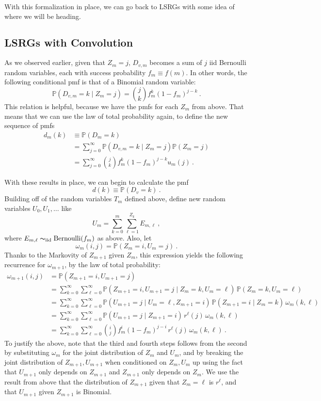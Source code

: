 \documentclass[12pt]{article}
\newcommand{\iid}{\mathrm{iid}}
\renewcommand{\P}{\mathbb{P}}
\begin{document}
With this formalization in place, we can go back to LSRGs with some idea
of where we will be heading.

\subsection{\textbf{\textsf{LSRGs with Convolution}}}

As we observed earlier, given that $Z_m=j$, $D_{v, m}$ becomes a sum of
$j$ iid Bernoulli random variables, each with success probability $f_m\equiv f(m)$.
In other words, the following conditional pmf is that of a Binomial random
variable: \[ \P(D_{v,m} = k \mid Z_m = j) = {j \choose k} f_m^k(1-f_m)^{j-k}\ .\]
This relation is helpful, because we have the pmfs for each $Z_m$ from above.
That means that we can use the law of total probability again, to define the
new sequence of pmfs
\begin{align*}
d_m(k) &\equiv \P(D_m=k) \\
       &= \sum_{j=0}^\infty \P(D_{v,m}=k \mid Z_m = j)\P(Z_m=j)\\
       &= \sum_{j=0}^\infty {j \choose k} f_m^k(1-f_m)^{j-k} u_m(j)\ .
\end{align*}\par
With these results in place, we can begin to calculate the pmf\[d(k)\equiv \P(D_v = k)\ .\]
Building off of the random variables $T_m$ defined above, define new random
variables $U_0,U_1,\dotsc$ like \[U_m = \sum_{k=0}^m \sum_{\ell=1}^{Z_k} E_{m,\ell}\ ,\]
where $E_{m,\ell}\thicksim_\iid \text{Bernoulli}(f_m)$ as above. Also, let
\[ \omega_m(i, j)=\P(Z_m=i, U_m=j)\ .\] Thanks to the Markovity of $Z_{m+1}$ given
$Z_m$, this expression yields the following recurrence for $\omega_{m+1}$, 
by the law of total probability:
\begin{align*}
\omega_{m+1}(i,j)&=\P(Z_{m+1}=i, U_{m+1}=j)\\
&= \sum_{k=0}^\infty \sum_{\ell=0}^\infty \P(Z_{m+1}=i,U_{m+1}=j\mid Z_m=k, U_m=\ell)\,\P(Z_m=k,U_m=\ell)\\
&= \sum_{k=0}^\infty\sum_{\ell=0}^\infty \P(U_{m+1}=j\mid U_m=\ell,Z_{m+1}=i)\,\P(Z_{m+1}=i\mid Z_m=k)\,\omega_m(k,\ell) \\
&= \sum_{k=0}^\infty\sum_{\ell=0}^\infty \P(U_{m+1}=j\mid Z_{m+1}=i)\,r^\ell(j)\,\omega_m(k,\ell) \\
&= \sum_{k=0}^\infty\sum_{\ell=0}^\infty \binom{i}{j} f_m^i (1 - f_m)^{j-i}\,r^\ell(j)\,\omega_m(k,\ell) \ .
\end{align*}
To justify the above, note that the third and fourth steps follows from the second by substituting
$\omega_m$ for the joint distribution of $Z_m$ and $U_m$, and by breaking the joint
distribution of $Z_{m+1},U_{m+1}$ when conditioned on $Z_m,U_m$ up using the fact that
$U_{m+1}$ only depends on $Z_{m+1}$ and $Z_{m+1}$ only depends on $Z_m$. We use the
result from above that the distribution of $Z_{m+1}$ given that $Z_m=\ell$ is $r^\ell$,
and that $U_{m+1}$ given $Z_{m+1}$ is Binomial.\par
\end{document}
